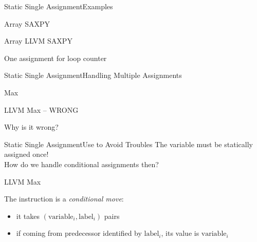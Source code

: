 \begin{frame}{Static Single Assignment}{Examples}
\begin{block}{Array SAXPY}
\end{block}

\begin{block}{Array LLVM SAXPY}
\end{block}

One assignment for loop counter 
\end{frame}

\begin{frame}{Static Single Assignment}{Handling Multiple Assignments}
\begin{block}{Max}
\end{block}

\begin{block}{LLVM Max -- WRONG}
\end{block}

Why is it \alert{wrong}?
\end{frame}


\begin{frame}{Static Single Assignment}{Use  to Avoid Troubles}
The  variable must be statically assigned once!\\
How do we handle conditional assignments then?

\begin{block}{LLVM Max}
\end{block}

The  instruction is a \emph{conditional move}:

\begin{itemize}
\item it takes $(\textrm{variable}_i, \textrm{label}_i)$ pairs
\item if coming from predecessor identified by $\textrm{label}_i$, its value is $\textrm{variable}_i$
\end{itemize}
\end{frame}


